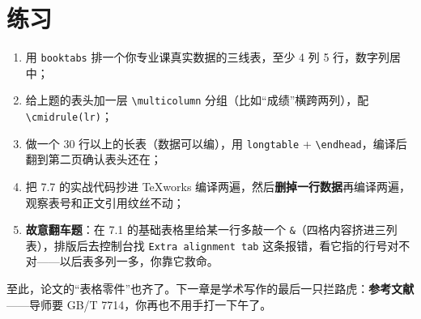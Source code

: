 \section*{练习}

\begin{enumerate}
\setlength{\itemsep}{2pt}
\item 用 \texttt{booktabs} 排一个你专业课真实数据的三线表，至少 4 列 5 行，数字列居中；
\item 给上题的表头加一层 \texttt{\textbackslash{}multicolumn} 分组（比如“成绩”横跨两列），配 \texttt{\textbackslash{}cmidrule(lr)}；
\item 做一个 30 行以上的长表（数据可以编），用 \texttt{longtable} + \texttt{\textbackslash{}endhead}，编译后翻到第二页确认表头还在；
\item 把 7.7 的实战代码抄进 TeXworks 编译两遍，然后\textbf{删掉一行数据}再编译两遍，观察表号和正文引用纹丝不动；
\item \textbf{故意翻车题}：在 7.1 的基础表格里给某一行多敲一个 \texttt{\&}（四格内容挤进三列表），排版后去控制台找 \texttt{Extra alignment tab} 这条报错，看它指的行号对不对——以后表多列一多，你靠它救命。
\end{enumerate}

至此，论文的“表格零件”也齐了。下一章是学术写作的最后一只拦路虎：\textbf{参考文献}——导师要 GB/T 7714，你再也不用手打一下午了。
